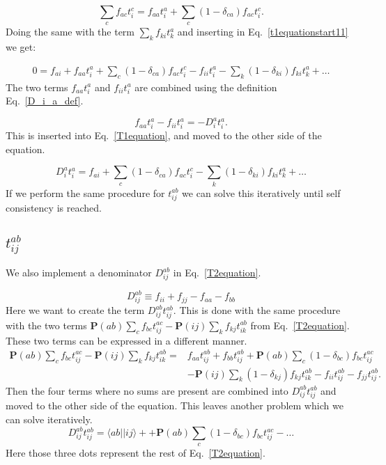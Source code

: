 \documentclass[graybox,sectrefs,envcountresetchap,open=right]{svmonodo}
\begin{document}
\begin{equation}
\sum_c f_{ac} t_i^c = f_{aa} t_i^a + \sum_c 
(1 - \delta_{ca} ) f_{ac} t_i^c .
\end{equation} 
Doing the same with the term $\sum_k f_{ki} t_k^a$ and inserting in Eq.~\ref{t1equationstart11} we get:

\begin{align}
0 = f_{ai} + f_{aa} t_i^a + \sum_c 
(1 - \delta_{ca} ) f_{ac} t_i^c - f_{ii} t_i^a - \sum_k (1 - \delta_{ki}) f_{ki} t_k^a + \dots \nonumber
\end{align} 
The two terms $f_{aa} t_i^a$ and $f_{ii} t_i^a$ are combined using the definition Eq.~\ref{D_i_a_def}. 

\begin{equation}
f_{aa} t_i^a - f_{ii} t_i^a = -D_i^a t_i^a .
\end{equation} 
This is inserted into Eq.~\ref{T1equation}, and moved to the other side of the equation.

\begin{equation}
D_i^a t_i^a = f_{ai} + \sum_c 
(1 - \delta_{ca} ) f_{ac} t_i^c - \sum_k (1 - \delta_{ki}) f_{ki} t_k^a + \dots
\end{equation} 
If we perform the same procedure for $t_{ij}^{ab}$ we can solve this iteratively until self consistency is reached.

\subsection{$t_{ij}^{ab}$}
We also implement a denominator $D_{ij}^{ab}$ in Eq.~\ref{T2equation}. 

\begin{equation}
D_{ij}^{ab} \equiv f_{ii} + f_{jj} - f_{aa} - f_{bb}
\end{equation} 
Here we want to create the term $D_{ij}^{ab} t_{ij}^{ab}$. This is done with the same procedure with the two terms $\mathbf{P}(ab) \sum_c f_{bc} t_{ij}^{ac}- \mathbf{P}(ij) \sum_k f_{kj} t_{ik}^{ab}$ 
from Eq.~\ref{T2equation}. These two terms can be expressed in a different manner.
\begin{align}
\mathbf{P}(ab) \sum_c f_{bc} t_{ij}^{ac}
- \mathbf{P}(ij) \sum_k f_{kj} t_{ik}^{ab} = & 
f_{aa} t_{ij}^{ab} + f_{bb} t_{ij}^{ab} + 
\mathbf{P}(ab) \sum_c (1-\delta_{bc}) f_{bc} t_{ij}^{ac} \nonumber \\ &
- \mathbf{P}(ij) \sum_k (1-\delta_{kj}) f_{kj} t_{ik}^{ab}
- f_{ii} t_{ij}^{ab}
- f_{jj} t_{ij}^{ab} . \nonumber
\end{align} 
Then the four terms where no sums are present are combined into $D_{ij}^{ab} t_{ij}^{ab}$ and moved to the other side of the equation. This leaves another problem which we can solve iteratively.
\begin{equation}
D_{ij}^{ab} t_{ij}^{ab} = \langle ab||ij \rangle + + 
\mathbf{P}(ab) \sum_c (1-\delta_{bc}) f_{bc} t_{ij}^{ac} - \dots \nonumber
\end{equation}
Here those three dots represent the rest of Eq.~\ref{T2equation}.
\end{document}
